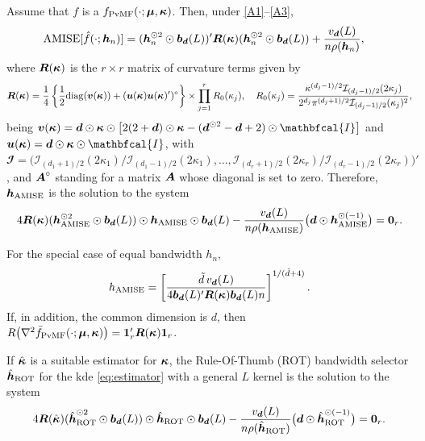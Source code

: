 \documentclass[oneside,11pt]{article}
\begin{document}
\begin{proposition}\label{prop:plugin}
Assume that $f$ is a $f_\mathrm{PvMF}(\cdot; \boldsymbol\mu,\boldsymbol\kappa)$. Then, under \ref{A1}--\ref{A3},
\begin{align*}
    \mathrm{AMISE}[\hat{f}(\cdot;{\boldsymbol{h}}_n)]=&\;({\boldsymbol{h}}_n^{\odot 2}\odot\boldsymbol{b}_{\boldsymbol{d}}(L))'\boldsymbol{R}(\boldsymbol\kappa)({\boldsymbol{h}}_n^{\odot 2}\odot\boldsymbol{b}_{\boldsymbol{d}}(L))+\frac{v_{\boldsymbol{d}}(L)}{n\rho({\boldsymbol{h}}_n)},
\end{align*}
where $\boldsymbol{R}(\boldsymbol\kappa)$ is the $r\times r$ matrix of curvature terms given by
\begin{align*}
\boldsymbol{R}(\boldsymbol\kappa)=\frac{1}{4}\left\{\frac{1}{2}\mathrm{diag}(\boldsymbol{v}(\boldsymbol\kappa))+(\boldsymbol{u}(\boldsymbol\kappa)\boldsymbol{u}(\boldsymbol\kappa)')^\circ\right\}\times\prod_{j=1}^{r} R_0(\kappa_j),\quad R_0(\kappa_j)=\frac{\kappa^{(d_j-1)/2}\mathcal{I}_{(d_j-1)/2}(2\kappa_j)}{2^{d_j} \pi^{(d_j+1)/2}\mathcal{I}_{(d_j-1)/2}(\kappa_j)^2},
\end{align*}
being $\bv(\bkappa)= \bd\odot\bkappa\odot\lrc{2(2+\bd)\odot\bkappa-(\bd^{\odot 2}-\bd+2)\odot\mathbfcal{I}}$ and $\bu(\bkappa)=\bd\odot\bkappa\odot\mathbfcal{I}$, with $\mathbfcal{I}=\big(\mathcal{I}_{(d_1+1)/2}(2\kappa_1)\big/\mathcal{I}_{(d_1-1)/2}(2\kappa_1),\ldots,\mathcal{I}_{(d_r+1)/2}(2\kappa_r)\big/\mathcal{I}_{(d_r-1)/2}(2\kappa_r)\big)'$, and $\boldsymbol{A}^\circ$ standing for a matrix $\boldsymbol{A}$ whose diagonal is set to zero. Therefore, ${\boldsymbol{h}}_{\mathrm{AMISE}}$ is the solution to the system
\begin{align}
 4 \boldsymbol{R}(\boldsymbol\kappa)({{\boldsymbol{h}}}_{\mathrm{AMISE}}^{\odot 2}\odot\boldsymbol{b}_{\boldsymbol{d}}(L))\odot {{\boldsymbol{h}}}_{\mathrm{AMISE}}\odot\boldsymbol{b}_{\boldsymbol{d}}(L)-\frac{v_{\boldsymbol{d}}(L)}{n\rho({\boldsymbol{h}}_{\mathrm{AMISE}})}\big(\boldsymbol{d}\odot{{\boldsymbol{h}}}_{\mathrm{AMISE}}^{\odot(-1)}\big)=\mathbf{0}_r.\label{eq:amisevmf2}
\end{align}

For the special case of equal bandwidth $h_n$,
\begin{align}
        h_\mathrm{AMISE}=\left[\frac{\tilde{d}\, v_{\boldsymbol{d}}(L)}{4\boldsymbol{b}_{\boldsymbol{d}}(L)'\boldsymbol{R}(\boldsymbol\kappa)\boldsymbol{b}_{\boldsymbol{d}}(L)n}\right]^{1/(\tilde{d}+4)}. \label{eq:hamisevmf}
\end{align}
If, in addition, the common dimension is $d$, then $R\big(\nabla^2 \bar{f}_\mathrm{PvMF}(\cdot; \boldsymbol{\mu},\boldsymbol\kappa)\big)=\mathbf{1}_r'\boldsymbol{R}(\boldsymbol\kappa)\mathbf{1}_r$.
\end{proposition}

If $\hat{\boldsymbol\kappa}$ is a suitable estimator for $\boldsymbol\kappa$,
the Rule-Of-Thumb (ROT) bandwidth selector $\hat{{\boldsymbol{h}}}_{\mathrm{ROT}}$ for the kde \eqref{eq:estimator} with a general $L$ kernel is the solution to the system
\begin{align}
   4 \boldsymbol{R}(\hat{\boldsymbol\kappa})(\hat{{\boldsymbol{h}}}_{\mathrm{ROT}}^{\odot 2}\odot\boldsymbol{b}_{\boldsymbol{d}}(L))\odot {\hat{{\boldsymbol{h}}}}_{\mathrm{ROT}}\odot\boldsymbol{b}_{\boldsymbol{d}}(L)-\frac{v_{\boldsymbol{d}}(L)}{n\rho(\hat{{\boldsymbol{h}}}_{\mathrm{ROT}})}\big(\boldsymbol{d}\odot\hat{{\boldsymbol{h}}}_{\mathrm{ROT}}^{\odot(-1)}\big)=\mathbf{0}_r.\label{eq:rotgeneral}
\end{align}
\end{document}
